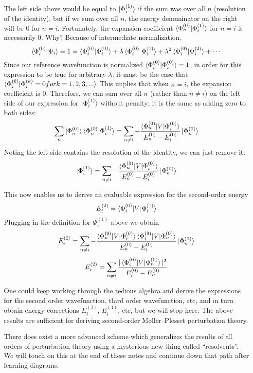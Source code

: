 \documentclass{article}
\newcommand{\lam}{\lambda}
\newcommand{\Ezero}{E^{(0)}}
\newcommand{\Phizero}{\Phi^{(0)}}
\newcommand{\Phione}{\Phi^{(1)}}
\begin{document}
The left side above would be equal to $\ket{\Phione_i}$ if the sum was over all $n$ (resolution of the identity), 
    but if we sum over all $n$, the energy denominator on the right will be 0 for $n = i$. 
Fortunately, the expansion coefficient $\braket{\Phizero_n | \Phione_i } $ for $n = i$ is necessarily 0.
Why? Because of intermediate normalization.
\[\braket{\Phizero_i | \Psi_i} = 1 = \braket{\Phizero_i | \Phizero_i} + \lam \braket{\Phizero_i \ \Phione_i} + \lam^2 \braket{\Phizero_i|\Phi_i^{(2)}} + \cdots \]
Since our reference wavefunction is normalized $\braket{\Phizero_i | \Phizero_i} = 1$, in order  for this expression to be true for arbitrary $\lam$,
it must be the case that $\braket{\Phizero_i | \Phi_i^{(k)} = 0 for k = 1,2,3,...}   $
This implies that when $n = i$, the expansion coefficient is 0.
Therefore, we can sum over all $n$ (rather than $n \neq i$) on the left side of our expression for $\ket{\Phione_i}$ without penalty; it is the same as adding zero to both sides:
\[ \sum_{n} \ket{ \Phizero_n} \braket{\Phizero_n | \Phione_i } = \sum_{n \neq i} -\frac{ \braket{ \Phizero_n | V | \Phizero_i} }{ \Ezero_n - \Ezero_i} \ket{\Phizero_n} \]
Noting the left side contains the resolution of the identity, we can just remove it:
\[ \ket{\Phione_i} = \sum_{n \neq i} -\frac{ \braket{ \Phizero_n | V | \Phizero_i} }{ \Ezero_n - \Ezero_i} \ket{\Phizero_n} \]

This now enables us to derive an evaluable expression for the second-order energy 
\[ E_i^{(2)} = \braket{\Phi_i^{(0)} | V | \Phi_i^{(1)}} \]
Plugging in the definition for $\Phi_i^{(1)}$ above we obtain
\[ E_i^{(2)} = \sum_{n \neq i} -\frac{ \braket{ \Phizero_n | V | \Phizero_i} \braket{ \Phizero_i | V | \Phizero_n} }{ \Ezero_n - \Ezero_i} \ket{\Phizero_n} \]
\[ E_i^{(2)} = \sum_{n \neq i} \frac{ |\braket{ \Phizero_i | V | \Phizero_n} |^2  }{ \Ezero_i - \Ezero_n} \]

One could keep working through the tedious algebra and derive the expressions for the second order wavefunction, third order wavefunction, etc, and
in turn obtain energy corrections $E_i^{(3)}$, $E_i^{(4)}$, etc, but we will stop here.
The above results are sufficient for deriving second-order M{\o}ller--Plesset perturbation theory.

There does exist a more advanced scheme which generalizes the results of all orders of perturbation theory using a mysterious new thing called ``resolvents''.
We will touch on this at the end of these notes and continue down that path after learning diagrams. 
\end{document}
